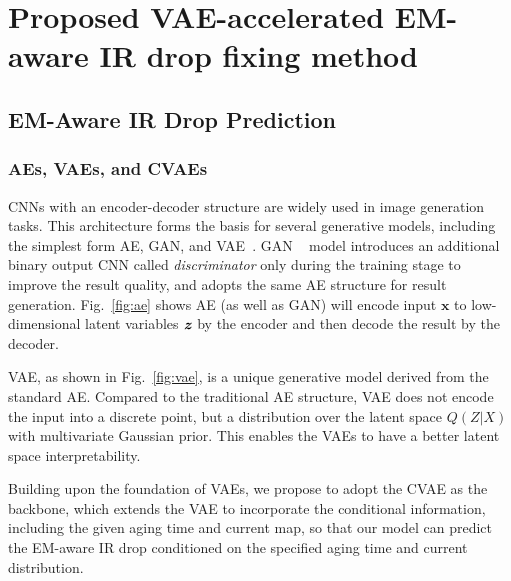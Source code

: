 \section{Proposed VAE-accelerated EM-aware IR drop fixing method}
\label{sec:strategy}

\subsection{EM-Aware IR Drop Prediction}
\label{subsec:emvae}

\subsubsection{AEs, VAEs, and CVAEs}
\label{subsec:vae_intro}

CNNs with an encoder-decoder structure are widely used in image generation tasks. 
 This architecture forms the basis for several generative models, including the simplest form AE, GAN, and VAE~\cite{Diederik:arxiv'22}. 
GAN ~\cite{Goodfellow:NIPS'14} model introduces an additional binary output CNN called \textit{discriminator} only during the training stage to improve the result quality, and adopts the same AE structure for result generation. Fig.~\ref{fig:ae} shows AE (as well as GAN) will encode input $\textbf{x}$ to low-dimensional latent variables $\textbf{\textit{z}}$ by the encoder and then decode the result by the decoder.


VAE, as shown in Fig.~\ref{fig:vae}, is a unique generative model derived from the standard AE. Compared to the traditional AE structure, VAE does not encode the input into a discrete point, but a distribution over the latent space $Q(Z|X)$ with multivariate Gaussian prior. This enables the VAEs to have a better latent space interpretability.

Building upon the foundation of VAEs,  we propose to adopt the CVAE as the backbone, which extends the VAE to incorporate the conditional information, including the given aging time and current map, so that our model can predict the EM-aware IR drop conditioned on the specified aging time and current distribution. 

